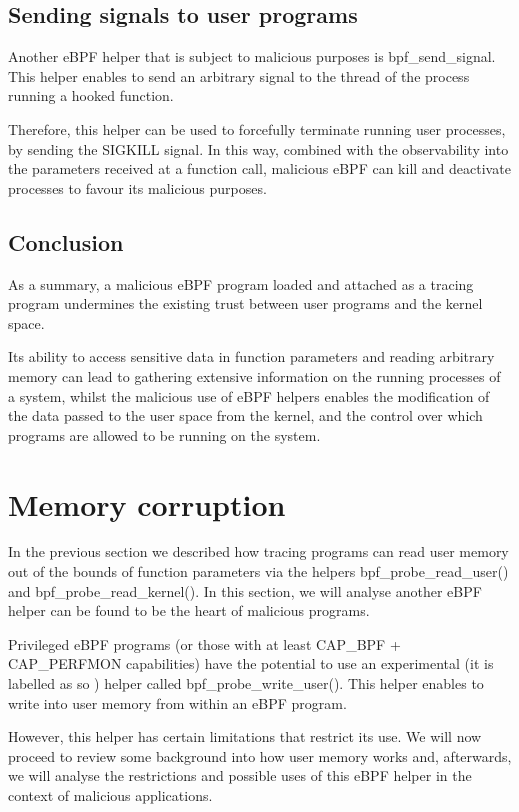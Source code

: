 \documentclass[12pt]{report} %
\begin{document}
\subsection{Sending signals to user programs}
Another eBPF helper that is subject to malicious purposes is bpf\_send\_signal. This helper enables to send an arbitrary signal to the thread of the process running a hooked function.

Therefore, this helper can be used to forcefully terminate running user processes, by sending the SIGKILL signal. In this way, combined with the observability into the parameters received at a function call, malicious eBPF can kill and deactivate processes to favour its malicious purposes.

\subsection{Conclusion} \label{subsection:tracing_attacks_conclusion}
As a summary, a malicious eBPF program loaded and attached as a tracing program undermines the existing trust between user programs and the kernel space. 

Its ability to access sensitive data in function parameters and reading arbitrary memory can lead to gathering extensive information on the running processes of a system, whilst the malicious use of eBPF helpers enables the modification of the data passed to the user space from the kernel, and the control over which programs are allowed to be running on the system.

\section{Memory corruption} \label{section:mem_corruption}
In the previous section we described how tracing programs can read user memory out of the bounds of function parameters via the helpers bpf\_probe\_read\_user() and bpf\_probe\_read\_kernel(). In this section, we will analyse another eBPF helper can be found to be the heart of malicious programs.

Privileged eBPF programs (or those with at least CAP\_BPF + CAP\_PERFMON capabilities) have the potential to use an experimental (it is labelled as so \cite{ebpf_helpers}) helper called bpf\_probe\_write\_user(). This helper enables to write into user memory from within an eBPF program. 

However, this helper has certain limitations that restrict its use. We will now proceed to review some background into how user memory works and, afterwards, we will analyse the restrictions and possible uses of this eBPF helper in the context of malicious applications.
\end{document}

